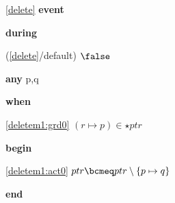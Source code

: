 \noindent \ref{delete}  \textbf{event}
\begin{block}
  \item   \textbf{during}
  \begin{block}
  \item[ (\ref{delete}/default) ]{$\false $} %
  \end{block}
  \item   \textbf{any} p,q
  \item   \textbf{when}
  \begin{block}
  \item[ \eqref{deletem1:grd0} ]{$(r \mapsto p) \in \star{ptr} $} %
  \end{block}
  \item   \textbf{begin}
  \begin{block}
  \item[ \eqref{deletem1:act0} ]{$ptr \bcmeq ptr \setminus \{ p \mapsto q \} $} %
  \end{block}
  \item   \textbf{end} \\
\end{block}
